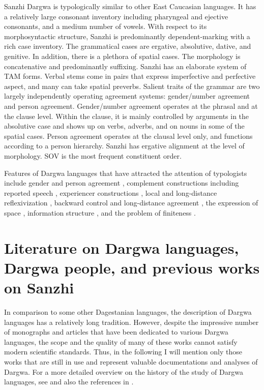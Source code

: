 Sanzhi Dargwa is typologically similar to other East Caucasian languages. It has a relatively large consonant inventory including pharyngeal and ejective consonants, and a medium number of vowels. With respect to its morphosyntactic structure, Sanzhi is predominantly dependent-marking with a rich case inventory. The grammatical cases are ergative, absolutive, dative, and genitive. In addition, there is a plethora of spatial cases. The morphology is concatenative and predominantly suffixing. Sanzhi has an elaborate system of TAM forms. Verbal stems come in pairs that express imperfective and perfective aspect, and many can take spatial preverbs. Salient traits of the grammar are two largely independently operating agreement systems: gender/number agreement and person agreement. Gender/number agreement operates at the phrasal and at the clause level. Within the clause, it is mainly controlled by arguments in the absolutive case and shows up on verbs, adverbs, and on nouns in some of the spatial cases. Person agreement operates at the clausal level only, and functions according to a person hierarchy. Sanzhi has ergative alignment at the level of morphology. SOV is the most frequent constituent order.

Features of Dargwa languages that have attracted the attention of typologists include gender and person agreement \citep{Sumbatova2011, Sumbatova2013, Belyaev2013, Belyaev2017a, Belyaev2017b, GanenkovForthcoming, Forker2016a}, complement constructions including reported speech \citep{Ganenkov2012, ForkerSubmittedb}, experiencer constructions \citep{Comrie.vandenBerg2006, Ganenkov2006, Ganenkov2013}, local and long-distance reflexivization \citep{Forker2014}, backward control and long-distance agreement \citep{Serdobolskaya2009, Serdobolskaya2010, Belyaev2016}, the expression of space \citep{Ganenkov2010, ForkerLTSanzhi}, information structure \citep{Sumbatova2009, Forker.Belyaev2016, Forker2016a}, and the problem of finiteness \citep{Kalinina.Sumbatova2007}.



\section[Literature and previous works]{Literature on Dargwa languages, Dargwa people, and previous works on Sanzhi}
\label{sec:Literature on Dargwa languages, Dargwa people, and previous works on Sanzhi}

In comparison to some other Dagestanian languages, the description of Dargwa languages has a relatively long tradition. However, despite the impressive number of monographs and articles that have been dedicated to various Dargwa languages, the scope and the quality of many of these works cannot satisfy modern scientific standards. Thus, in the following I will mention only those works that are still in use and represent valuable documentations and analyses of Dargwa. For a more detailed overview on the history of the study of Dargwa languages, see \citet{Magometov1983} and also the references in \citet{Temirbulatova2005}.


